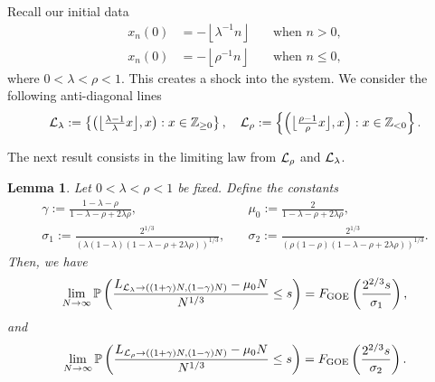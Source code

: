 \documentclass[12pt,a4paper]{article}
\numberwithin{equation}{section}
\newcommand{\GOE}{\mathrm{GOE}}
\newcommand{\Pb}{\mathbb{P}}
\newcommand{\Z}{\mathbb{Z}}
\newtheorem{lem}[prop]{Lemma}
\begin{document}
Recall our initial data \begin{equation}
 \begin{aligned}
 x_{n}(0)&=-\left\lfloor \lambda^{-1} n\right\rfloor& \quad \text{when }n>0,\\
 x_{n}(0)&=-\left\lfloor \rho^{-1} n \right\rfloor& \quad \text{when } n\leq 0,
 \end{aligned}
 \end{equation}
 where $0<\lambda<\rho<1$. This creates a shock into the system.
We consider the following anti-diagonal lines
\begin{align}
{\cal L}_{\lambda}:= \left\{\left(\big\lfloor\tfrac{\lambda-1}{\lambda} x\big\rfloor, x\right): x\in \Z_{\geq 0}\right\},
\quad {\cal L}_{\rho}:= \left\{\left(\big\lfloor \tfrac{\rho-1}{\rho} x\big\rfloor, x\right) : x\in \Z_{<0}\right\}.
\end{align}

The next result consists in the limiting law from ${\cal L}_\rho$ and ${\cal L}_\lambda$.
\begin{lem}\label{Lemma1} Let $0< \lambda < \rho < 1$ be fixed. Define the constants
\begin{equation}
\begin{aligned}\label{parameter}
\gamma:= \frac{1-\lambda-\rho}{1-\lambda-\rho+2 \lambda\rho}, &\quad \mu_0:= \frac{2}{1-\lambda-\rho+2\lambda\rho},\\ \sigma_1:= \frac{2^{1/3}}{\left(\lambda(1-\lambda)(1-\lambda-\rho+2\lambda\rho)\right)^{1/3}}, & \quad \sigma_2:= \frac{2^{1/3}}{\left(\rho(1-\rho)(1-\lambda-\rho+2\lambda\rho)\right)^{1/3}}.
\end{aligned}
\end{equation}
Then, we have
\begin{align}\label{eq:Lemma1}
 \lim_{N\to \infty}\Pb\left(\frac{L_{{\cal L}_{\lambda}\to((1+\gamma) N, (1-\gamma)N )}-\mu_0 N}{N^{1/3}}\leq s\right)=F_{\GOE}\left(\frac{2^{2/3} s}{\sigma_1}\right),
\end{align}
and
\begin{align}\label{eq:Lemma2}
 \lim_{N\to \infty}\Pb\left(\frac{L_{{\cal L}_{\rho}\to((1+\gamma) N, (1-\gamma)N )}-\mu_0 N}{N^{1/3}}\leq s\right)=F_{\GOE}\left(\frac{2^{2/3} s}{\sigma_2}\right).
\end{align}
\end{lem}
\end{document}
